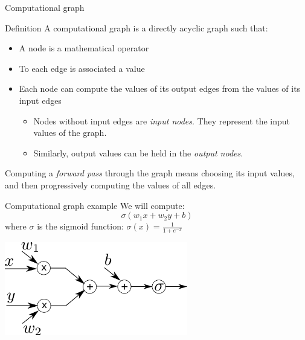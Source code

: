 \documentclass[handout,xcolor=pdftex,dvipsnames,table,mathserif]{beamer}
\begin{document}
\begin{frame}{Computational graph}

\begin{block}{Definition}
  A computational graph is a directly acyclic graph such that:
  \begin{itemize}
  \item A node is a mathematical operator
  \item To each edge is associated a value
  \item Each node can compute the values of its output edges from the values of its input edges
    \begin{itemize}
    \item Nodes without input edges are \emph{input nodes}. They represent the input values of the graph.
    \item Similarly, output values can be held in the \emph{output nodes}.
    \end{itemize}
  \end{itemize}
\end{block}

Computing a \emph{forward pass} through the graph means choosing its input values, and then progressively computing the values of all edges.


\end{frame}


\begin{frame}{Computational graph example}
  We will compute:
  \[
  \sigma(w_1x + w_2y + b)
  \]
  where $\sigma$ is the sigmoid function: $\sigma(x) = \frac{1}{1 + e^{-x}}$

\vspace{3em}
\pause

  \centering
  \includegraphics[width=0.6\textwidth]{compu_graph}


\end{frame}
\end{document}
